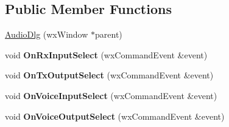 \subsection*{Public Member Functions}
\begin{DoxyCompactItemize}
\item 
\hyperlink{class_audio_dlg_aca8f77272717136445248c9dce578bed}{Audio\-Dlg} (wx\-Window $\ast$parent)
\item 
\hypertarget{class_audio_dlg_ade43627922e25e984ca4ebff7bf70339}{void {\bfseries On\-Rx\-Input\-Select} (wx\-Command\-Event \&event)}\label{class_audio_dlg_ade43627922e25e984ca4ebff7bf70339}

\item 
\hypertarget{class_audio_dlg_a37703c36702cb622f0ceb152fdcb6d1c}{void {\bfseries On\-Tx\-Output\-Select} (wx\-Command\-Event \&event)}\label{class_audio_dlg_a37703c36702cb622f0ceb152fdcb6d1c}

\item 
\hypertarget{class_audio_dlg_a9e472e745d49396f1d3c8f8907e6601f}{void {\bfseries On\-Voice\-Input\-Select} (wx\-Command\-Event \&event)}\label{class_audio_dlg_a9e472e745d49396f1d3c8f8907e6601f}

\item 
\hypertarget{class_audio_dlg_a2711e45fea17d5f76c2453fc9654b008}{void {\bfseries On\-Voice\-Output\-Select} (wx\-Command\-Event \&event)}\label{class_audio_dlg_a2711e45fea17d5f76c2453fc9654b008}

\end{DoxyCompactItemize}
